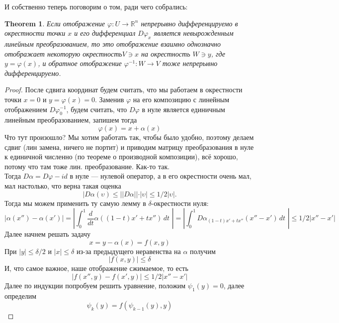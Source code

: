\documentclass[a4paper,12pt]{article} %
\newtheorem{theorem}{Theorem}
\theoremstyle{definition}
\begin{document}
И собственно теперь поговорим о том, ради чего собрались:
\begin{theorem}
	Если отображение $\varphi : U \rightarrow \mathbb{R}^n$ непрерывно дифференцируемо в окрестности точки $x$ и его дифференциал $D \varphi_x$ является невырожденным линейным преобразованием, то это отображение взаимно однозначно отображает некоторую окрестность$V \ni x$ на окрестность $W \ni y$, где $y=\varphi(x)$, и обратное отображение $\varphi^{-1}  :  W \rightarrow V$ тоже непрерывно дифференцируемо.
\end{theorem}
\begin{proof}
	После сдвига координат будем считать, что мы работаем в окрестности точки $x= 0$ и $y=\varphi (x) = 0$. Заменив $\varphi$ на его композицию с линейным отображением $D\varphi^{-1}_0$, будем считать, что $D\varphi$ в нуле является единичным линейным преобразованием, запишем тогда
	\begin{equation}
		\varphi (x) = x + \alpha (x)
	\end{equation}
	Что тут произошло? Мы хотим работать так, чтобы было удобно, поэтому делаем сдвиг (лин замена, ничего не портит) и приводим матрицу преобразования в нуле к единичной численно (по теореме о производной композиции), всё хорошо, потому что там тоже лин. преобразование. Как-то так.\\
	Тогда $D\alpha = D\varphi - id$  в нуле --- нулевой оператор, а в его окрестности очень мал, мал настолько, что верна такая оценка
	\begin{equation}
		|D \alpha (\upsilon) \leq ||D \alpha || \cdot |\upsilon| \leq 1/2 |\upsilon|.
	\end{equation}
	Тогда мы можем применить ту самую лемму в $\delta$-окрестности нуля:
	\begin{equation}
		|\alpha(x'') - \alpha(x') | = |\int_0^1 \frac{d}{dt} \alpha ((1 - t) x' + t x'') \, dt \, \,| =  |\int_0^1 D \alpha_{(1 - t) x' + t x''}  (x'' - x') \, dt \, \,| \leq 1/2 |x'' - x'|
	\end{equation}
	Далее начнем решать задачу
	$$ x = y - \alpha(x) = f(x, y)$$
	При $|y| \leq \delta/2$ и $|x| \leq \delta$ из-за предыдущего неравенства на $\alpha$ получим
	$$|f(x, y) | \leq \delta $$
	И, что самое важное, наше отображение сжимаемое, то есть
	\begin{equation}
		|f(x'', y) - f(x', y)| \leq 1/2 |x'' - x'|
	\end{equation}
	Далее по индукции попробуем решить уравнение, положим $\psi_1 (y) = 0$, далее определим
	$$\psi_k (y) = f(\psi_{k-1}(y), y)$$

\end{proof}
\end{document}
